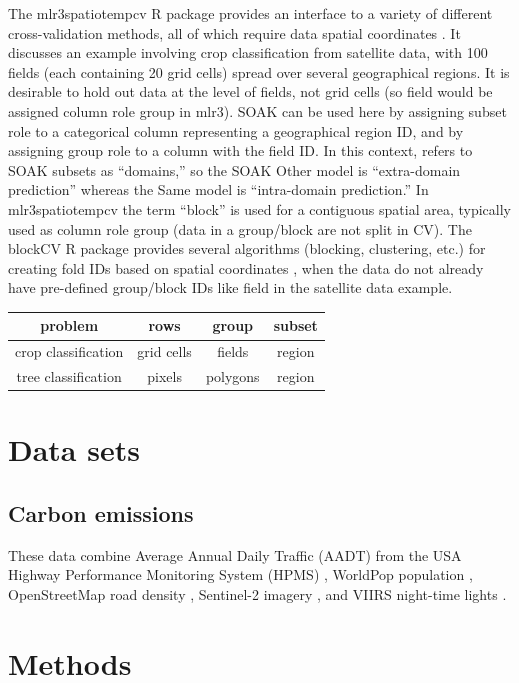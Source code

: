 \documentclass{article}
\begin{document}
The mlr3spatiotempcv R package provides an interface to a variety of different cross-validation methods, all of which require data spatial coordinates \citep{schratz2024}.
It discusses an example involving crop classification from satellite data, with 100 fields (each containing 20 grid cells) spread over several geographical regions.
It is desirable to hold out data at the level of fields, not grid cells (so field would be assigned column role group in mlr3).
SOAK can be used here by assigning subset role to a categorical column representing a geographical region ID, and by assigning group role to a column with the field ID.
In this context, \citet{brenning2005} refers to SOAK subsets as ``domains,'' so the SOAK Other model is ``extra-domain prediction'' whereas the Same model is ``intra-domain prediction.''
In mlr3spatiotempcv the term ``block'' is used for a contiguous spatial area, typically used as column role group (data in a group/block are not split in CV).
The blockCV R package provides several algorithms (blocking, clustering, etc.) for creating fold IDs based on spatial coordinates \citep{valavi2019}, when the data do not already have pre-defined group/block IDs like field in the satellite data example.

\begin{tabular}{cccc}
problem & rows & group & subset \\
\hline
crop classification & grid cells & fields & region \\
tree classification & pixels & polygons & region
\end{tabular}

\section{Data sets}
\subsection{Carbon emissions}
These data combine Average Annual Daily Traffic (AADT) from the USA Highway Performance Monitoring System (HPMS) \citet{bilal_hpms_aadt}, WorldPop population \citet{bilal_worldpop}, OpenStreetMap road density \citet{bilal_osm_roads}, Sentinel-2 imagery \citet{bilal_sentinel2}, and VIIRS night-time lights \citet{bilal_ntl_viirs}.


\section{Methods}
\end{document}
